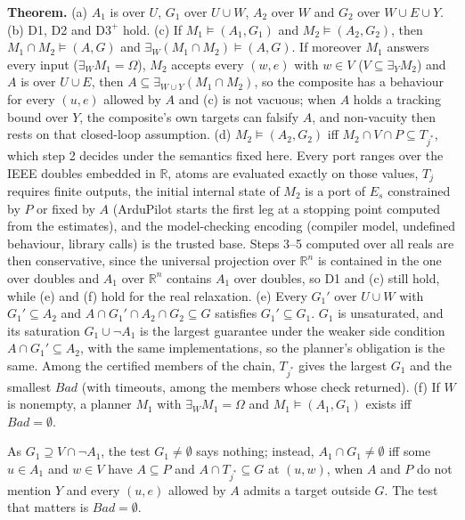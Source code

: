 \documentclass[10pt,a4paper]{article}
\newcommand{\ex}{\exists}
\newcommand{\Dthree}{\mathrm{D3}^{+}}
\newcommand{\Bad}{\mathit{Bad}}
\begin{document}
\textbf{Theorem.} (a) $A_1$ is over $U$, $G_1$ over $U\cup W$, $A_2$ over $W$ and $G_2$ over $W\cup E\cup Y$. (b) D1, D2 and $\Dthree$ hold. (c) If $M_1\models(A_1,G_1)$ and $M_2\models(A_2,G_2)$, then $M_1\cap M_2\models(A,G)$ and $\ex_W(M_1\cap M_2)\models(A,G)$. If moreover $M_1$ answers every input ($\ex_W M_1=\Omega$), $M_2$ accepts every $(w,e)$ with $w\in V$ ($V\subseteq\ex_Y M_2$) and $A$ is over $U\cup E$, then $A\subseteq\ex_{W\cup Y}(M_1\cap M_2)$, so the composite has a behaviour for every $(u,e)$ allowed by $A$ and (c) is not vacuous; when $A$ holds a tracking bound over $Y$, the composite's own targets can falsify $A$, and non-vacuity then rests on that closed-loop assumption. (d) $M_2\models(A_2,G_2)$ iff $M_2\cap V\cap P\subseteq T_{j^*}$, which step 2 decides under the semantics fixed here. Every port ranges over the IEEE doubles embedded in $\mathbb R$, atoms are evaluated exactly on those values, $T_j$ requires finite outputs, the initial internal state of $M_2$ is a port of $E_s$ constrained by $P$ or fixed by $A$ (ArduPilot starts the first leg at a stopping point computed from the estimates), and the model-checking encoding (compiler model, undefined behaviour, library calls) is the trusted base. Steps 3--5 computed over all reals are then conservative, since the universal projection over $\mathbb R^n$ is contained in the one over doubles and $A_1$ over $\mathbb R^n$ contains $A_1$ over doubles, so D1 and (c) still hold, while (e) and (f) hold for the real relaxation. (e) Every $G_1'$ over $U\cup W$ with $G_1'\subseteq A_2$ and $A\cap G_1'\cap A_2\cap G_2\subseteq G$ satisfies $G_1'\subseteq G_1$. $G_1$ is unsaturated, and its saturation $G_1\cup\lnot A_1$ is the largest guarantee under the weaker side condition $A\cap G_1'\subseteq A_2$, with the same implementations, so the planner's obligation is the same. Among the certified members of the chain, $T_{j^*}$ gives the largest $G_1$ and the smallest $\Bad$ (with timeouts, among the members whose check returned). (f) If $W$ is nonempty, a planner $M_1$ with $\ex_W M_1=\Omega$ and $M_1\models(A_1,G_1)$ exists iff $\Bad=\emptyset$.

As $G_1\supseteq V\cap\lnot A_1$, the test $G_1\neq\emptyset$ says nothing; instead, $A_1\cap G_1\neq\emptyset$ iff some $u\in A_1$ and $w\in V$ have $A\subseteq P$ and $A\cap T_{j^*}\subseteq G$ at $(u,w)$, when $A$ and $P$ do not mention $Y$ and every $(u,e)$ allowed by $A$ admits a target outside $G$. The test that matters is $\Bad=\emptyset$.
\end{document}
